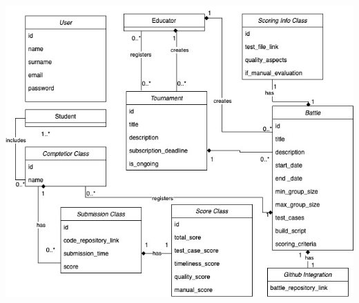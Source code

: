 \begin{center}
\includegraphics[width=\textwidth,height=\textheight,keepaspectratio]{DomainClassDiagramRASD (1).jpg}
\end{center}
\newpage
